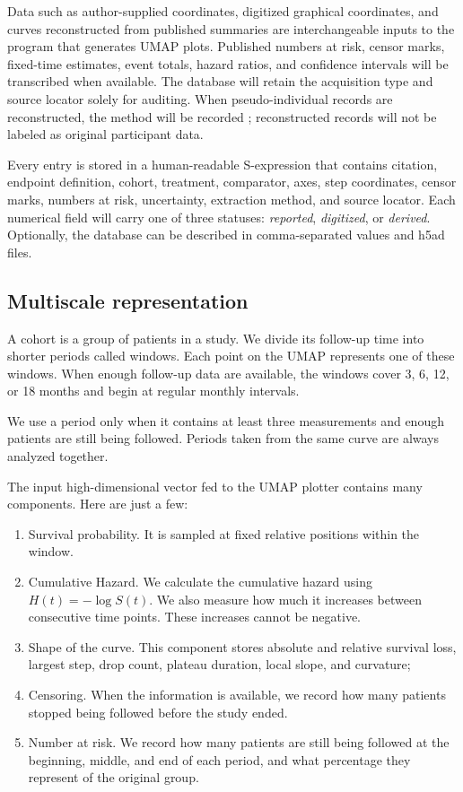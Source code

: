 \documentclass[17pt]{extarticle}
\begin{document}
Data such as author-supplied coordinates, digitized graphical coordinates, and curves reconstructed from published summaries are interchangeable inputs to the program that generates UMAP plots. Published numbers at risk, censor marks, fixed-time estimates, event totals, hazard ratios, and confidence intervals will be transcribed when available. The database will retain the acquisition type and source locator solely for auditing. When pseudo-individual records are reconstructed, the method will be recorded \citep{guyot2012ipd}; reconstructed records will not be labeled as original participant data.

Every entry is stored in a human-readable S-expression that contains citation, endpoint definition, cohort, treatment, comparator, axes, step coordinates, censor marks, numbers at risk, uncertainty, extraction method, and source locator. Each numerical field will carry one of three statuses: \emph{reported}, \emph{digitized}, or \emph{derived}. Optionally, the database can be described in comma-separated values and h5ad files.


\subsection{Multiscale representation}
A cohort is a group of patients in a study. We divide its follow-up time into shorter periods called windows. Each point on the UMAP represents one of these windows. When enough follow-up data are available, the windows cover 3, 6, 12, or 18 months and begin at regular monthly intervals.

We use a period only when it contains at least three measurements and enough patients are still being followed. Periods taken from the same curve are always analyzed together.

The input high-dimensional vector fed to the UMAP plotter contains many components. Here are just a few:


\begin{enumerate}
  \item Survival probability. It is sampled at fixed relative positions within the window.
  \item Cumulative Hazard. We calculate the cumulative hazard using \(H(t)=-\log S(t)\). We also measure how much it increases between consecutive time points. These increases cannot be negative.
  \item Shape of the curve. This component stores absolute and relative survival loss, largest step, drop count, plateau duration, local slope, and curvature;
  \item Censoring. When the information is available, we record how many patients stopped being followed before the study ended.
  \item Number at risk. We record how many patients are still being followed at the beginning, middle, and end of each period, and what percentage they represent of the original group.
\end{enumerate}
\end{document}
